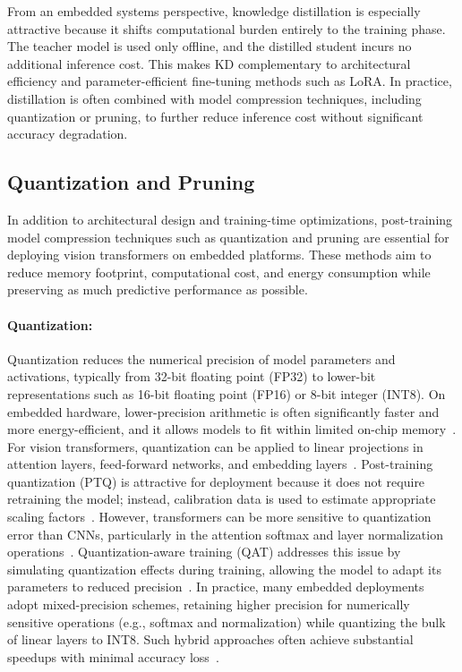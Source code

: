 \documentclass[runningheads,a4paper]{llncs}
\begin{document}
From an embedded systems perspective, knowledge distillation is especially attractive because it shifts computational burden entirely to the training phase. The teacher model is used only offline, and the distilled student incurs no additional inference cost. This makes KD complementary to architectural efficiency and parameter-efficient fine-tuning methods such as LoRA. In practice, distillation is often combined with model compression techniques, including quantization or pruning, to further reduce inference cost without significant accuracy degradation.

\subsection{Quantization and Pruning}
In addition to architectural design and training-time optimizations, post-training model compression techniques such as quantization and pruning are essential for deploying vision transformers on embedded platforms. These methods aim to reduce memory footprint, computational cost, and energy consumption while preserving as much predictive performance as possible.

\paragraph{Quantization:}
Quantization reduces the numerical precision of model parameters and activations, typically from 32-bit floating point (FP32) to lower-bit representations such as 16-bit floating point (FP16) or 8-bit integer (INT8). On embedded hardware, lower-precision arithmetic is often significantly faster and more energy-efficient, and it allows models to fit within limited on-chip memory~\cite{Roth2024ResourceEff}. For vision transformers, quantization can be applied to linear projections in attention layers, feed-forward networks, and embedding layers~\cite{Li2023IViT}. Post-training quantization (PTQ) is attractive for deployment because it does not require retraining the model; instead, calibration data is used to estimate appropriate scaling factors~\cite{Shang2024PTQ}. However, transformers can be more sensitive to quantization error than CNNs, particularly in the attention softmax and layer normalization operations~\cite{Ranjan2024MixQViT}. Quantization-aware training (QAT) addresses this issue by simulating quantization effects during training, allowing the model to adapt its parameters to reduced precision~\cite{IBM2023QAT}. In practice, many embedded deployments adopt mixed-precision schemes, retaining higher precision for numerically sensitive operations (e.g., softmax and normalization) while quantizing the bulk of linear layers to INT8. Such hybrid approaches often achieve substantial speedups with minimal accuracy loss~\cite{Lin2022FQViT}.
\end{document}

